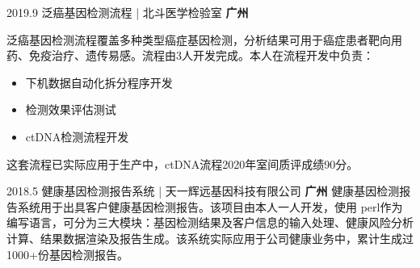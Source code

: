 \documentclass[a4paper]{friggeri-cv_reccius-experiment}
\begin{document}
\begin{entrylist}
   \entry
    {2019.9\enspace}
    {泛癌基因检测流程 | }{\small{北斗医学检验室}}
    {\normalsize\textbf{\color{ipsgreen}\faMapMarker\space 广州}}
    {
    泛癌基因检测流程覆盖多种类型癌症基因检测，分析结果可用于癌症患者靶向用药、免疫治疗、遗传易感。流程由3人开发完成。本人在流程开发中负责：
    
    \begin{itemize}
        \item 下机数据自动化拆分程序开发
        \item 检测效果评估测试
        \item ctDNA检测流程开发
    \end{itemize}
    
    这套流程已实际应用于生产中，ctDNA流程2020年室间质评成绩90分。\\
    }
    
  \entry
    {2018.5\enspace}
    {健康基因检测报告系统 | }{\small{天一辉远基因科技有限公司}}
    {\normalsize\textbf{\color{ipsgreen}\faMapMarker\space 广州}}
    {健康基因检测报告系统用于出具客户健康基因检测报告。该项目由本人一人开发，使用
    perl作为编写语言，可分为三大模块：基因检测结果及客户信息的输入处理、健康风险分析计算、结果数据渲染及报告生成。该系统实际应用于公司健康业务中，累计生成过1000+份基因检测报告。
    \eduspace\\}

\end{entrylist}
\clearpage
\end{document}
